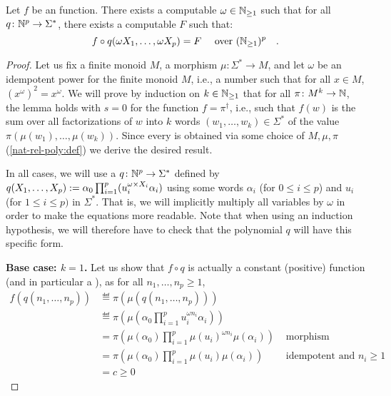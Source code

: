 \begin{lemma}
    \label{n-poly-combinatorics:lem}
    Let $f$ be an  function. 
    There exists a computable $\omega \in \mathbb{N}_{\geq 1}$
    such that for all 
    $q \colon \mathbb{N}^p \to \Sigma^*$,
    there exists a computable  $F$
    such that:
    \begin{equation*}
        f \circ q(\omega X_1, \dots, \omega X_p)
        =
        F
        \quad 
        \text{ over } (\mathbb{N}_{\geq 1})^p
        \quad .
    \end{equation*}
\end{lemma}
\begin{proof}
    Let us fix a finite monoid $M$, a morphism $\mu \colon \Sigma^* \to M$, and 
    let $\omega$ be an idempotent power for the finite monoid $M$,
    i.e., a number such that for all $x \in M$,
    $(x^{\omega})^2 = x^{\omega}$.
    We will prove by induction on $k \in \mathbb{N}_{\geq 1}$
    that for all
    $\pi \colon M^k \to \mathbb{N}$,
    the lemma holds with $s = 0$ for the function 
    $f = \pi^\dagger$, i.e., such that
    $f(w)$ is the sum over all factorizations of $w$
    into $k$ words $(w_1, \dots, w_k) \in \Sigma^*$
    of the value $\pi(\mu(w_1), \dots, \mu(w_k))$.
    Since every 
    is obtained via some choice of $M, \mu, \pi$ (\cref{nat-rel-poly:def})
    we derive the desired result.

    In all cases, we will use a  $q \colon \mathbb{N}^p \to
    \Sigma^*$ defined by $q(X_1, \dots, X_p) \mathrel{:=} \alpha_0 \prod_{i = 1}^p
    (u_i^{\omega \times X_i} \alpha_i)$ using some words $\alpha_i$ (for $0 \leq i
    \leq p$) and $u_i$ (for $1 \leq i \leq p)$ in $\Sigma^*$. That is, we will
    implicitly multiply all variables by $\omega$ in order to make the
    equations more readable. Note that when using an induction hypothesis, we
    will therefore have to check that the polynomial $q$ will have this
    specific form.

    \textbf{Base case: $k = 1$.}
    Let us show that $f \circ q$ is
    actually a constant (positive) function (and in particular a ), as for
    all $n_1, \dots, n_p \geq 1$,
    \begin{align*}
        f(q(n_1, \dots, n_p))
        &\eqdef \pi\left(\mu(q(n_1, \dots, n_p))\right) \\
        &\eqdef \pi\left(\mu(\alpha_0 \prod_{i = 1}^p u_i^{\omega n_i} \alpha_i)\right)
        \\
        &= \pi\left(\mu(\alpha_0) \prod_{i = 1}^p \mu(u_i)^{\omega n_i} \mu(\alpha_i)\right) 
        & \text{ morphism }
        \\
        &= \pi\left(\mu(\alpha_0) \prod_{i = 1}^p \mu(u_i) \mu(\alpha_i)\right)
        & \text{ idempotent and } n_i \geq 1 \\
        &= c \geq 0
    \end{align*}


\end{proof}

